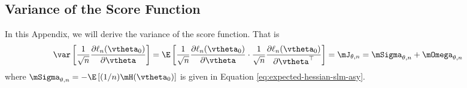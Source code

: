 \documentclass[english,12pt]{book}\usepackage[]{graphicx}\usepackage[]{xcolor}
\begin{document}
\begin{subappendices}
 \section{Variance of the Score Function}\label{appendix-score}

In this Appendix, we will derive the variance of the score function. That is
\begin{equation}
\begin{aligned}
 \var\left[\frac{1}{\sqrt{n}}\frac{\partial \ell_n (\vtheta_0)}{\partial \vtheta}\right] = \E\left[\frac{1}{\sqrt{n}}\frac{\partial \ell_n (\vtheta_0)}{\partial \vtheta}\cdot\frac{1}{\sqrt{n}}\frac{\partial \ell_n (\vtheta_0)}{\partial \vtheta^\top}\right] & = \mJ_{\theta, n} = \mSigma_{\theta, n} + \mOmega_{\theta, n}
  \end{aligned}
\end{equation}
%
where $\mSigma_{\theta, n}= - \E\left[(1/n)\mH(\vtheta_0)\right]$ is given in Equation \eqref{eq:expected-hessian-slm-asy}. 

% 


\end{subappendices}
\end{document}
